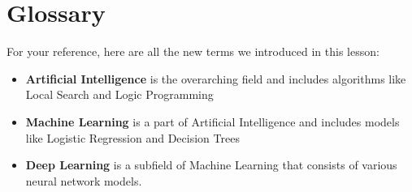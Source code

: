 \section{Glossary}

For your reference, here are all the new terms we introduced in this lesson:

\begin{itemize}
    \item \textbf{Artificial Intelligence} is the overarching field and includes algorithms like Local Search and Logic Programming
    \item \textbf{Machine Learning} is a part of Artificial Intelligence and includes models like Logistic Regression and Decision Trees
    \item \textbf{Deep Learning} is a subfield of Machine Learning that consists of various neural network models.
\end{itemize}
